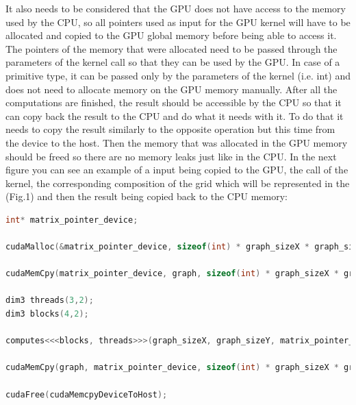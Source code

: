 \documentclass[conference]{IEEEtran}
\begin{document}
It also needs to be considered that the GPU does not have access to the memory used by the CPU, so all pointers used as input for the GPU kernel will have to be allocated and copied to the GPU global memory before being able to access it. The pointers of the memory that were allocated need to be passed through the parameters of the kernel call so that they can be used by the GPU. In case of a primitive type, it can be passed only by the parameters of the kernel (i.e. int) and does not need to allocate memory on the GPU memory manually. After all the computations are finished, the result should be accessible by the CPU so that it can copy back the result to the CPU and do what it needs with it. To do that it needs to copy the result similarly to the opposite operation but this time from the device to the host. Then the memory that was allocated in the GPU memory should be freed so there are no memory leaks just like in the CPU. In the next figure you can see an example of a input being copied to the GPU, the call of the kernel, the corresponding composition of the grid which will be represented in the (Fig.1) and then the result being copied back to the CPU memory:
\begin{lstlisting}[language=C++, caption=CUDA Example]
int* matrix_pointer_device;

cudaMalloc(&matrix_pointer_device, sizeof(int) * graph_sizeX * graph_sizeY);

cudaMemCpy(matrix_pointer_device, graph, sizeof(int) * graph_sizeX * graph_sizeY, cudaMemcpyHostToDevice);

dim3 threads(3,2);
dim3 blocks(4,2); 

computes<<<blocks, threads>>>(graph_sizeX, graph_sizeY, matrix_pointer_device);

cudaMemCpy(graph, matrix_pointer_device, sizeof(int) * graph_sizeX * graph_sizeY, cudaMemcpyDeviceToHost);

cudaFree(cudaMemcpyDeviceToHost);

\end{lstlisting}
\end{document}
